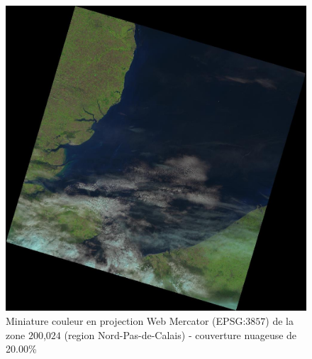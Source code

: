 \documentclass{book}
\begin{document}
\begin{figure}[H]
\begin{center}
\includegraphics[scale=0.18]{images/LC82000242013271LGN00.jpg}
\end{center}
\caption{Miniature couleur en projection Web Mercator (EPSG:$3857$) de la zone $200$,$024$ (region Nord-Pas-de-Calais) - couverture nuageuse de 20.00\% }
\label{cloud1}
\end{figure}
\end{document}
